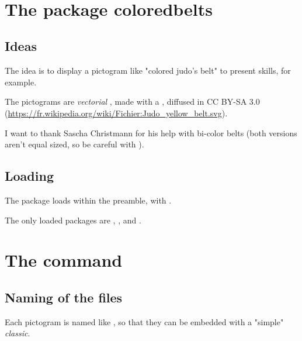\documentclass[english,11pt,a4paper]{article}
\begin{document}
\vfill~

\pagebreak

\section{The package coloredbelts}

\subsection{Ideas}

The idea is to display a pictogram like "colored judo's belt" to present skills, for example.

\medskip

The pictograms are \textit{vectorial} , made with a , diffused in CC BY-SA 3.0 (\url{https://fr.wikipedia.org/wiki/Fichier:Judo_yellow_belt.svg}).

\medskip

I want to thank Sascha Christmann for his help with bi-color belts (both versions aren't equal sized, so be careful with ).

\subsection{Loading}

The package loads within the preamble, with .

The only loaded packages are , ,  and .

\begin{codehigh}[language=latex/latex2,style/main=cyan!10,style/code=cyan!10]
\usepackage{coloredbelts}
\end{codehigh}

\section{The command}

\subsection{Naming of the files}

Each pictogram is named like , so that they can be embedded with a "simple"  \textit{classic}.
\end{document}
